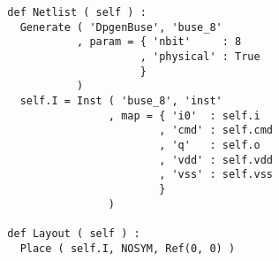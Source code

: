 \begin{itemize}
\begin{verbatim}
  def Netlist ( self ) :
    Generate ( 'DpgenBuse', 'buse_8'
             , param = { 'nbit'     : 8
                       , 'physical' : True
                       }
             )      
    self.I = Inst ( 'buse_8', 'inst'
                  , map = { 'i0'  : self.i
                          , 'cmd' : self.cmd
                          , 'q'   : self.o
                          , 'vdd' : self.vdd
                          , 'vss' : self.vss
                          }
                  )
    
  def Layout ( self ) :
    Place ( self.I, NOSYM, Ref(0, 0) )
\end{verbatim}
\end{itemize}
